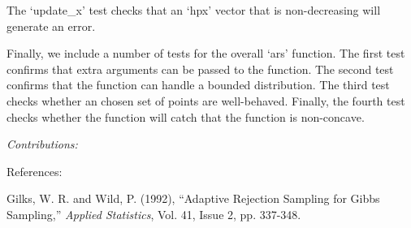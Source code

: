 \documentclass{article}
\begin{document}
The `update\_x' test checks that an `hpx' vector that is non-decreasing will generate an error.

Finally, we include a number of tests for the overall `ars' function.  The first test confirms that extra arguments can be passed to the function. The second test confirms that the function can handle a bounded distribution.  The third test checks whether an chosen set of points are well-behaved.  Finally, the fourth test checks whether the function will catch that the function is non-concave.

\vspace{10 MM}

\emph{Contributions:}

\vspace{10 MM}

References:

Gilks, W. R. and Wild, P. (1992), ``Adaptive Rejection Sampling for Gibbs Sampling,'' \emph{Applied Statistics}, Vol. 41, Issue 2, pp. 337-348.
\end{document}
